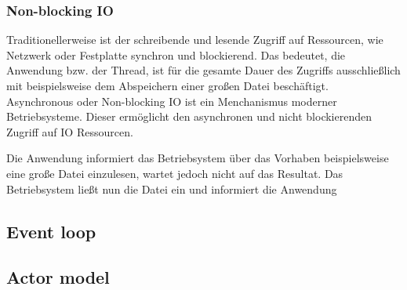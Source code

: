 \subsubsection{Non-blocking IO}
Traditionellerweise ist der schreibende und lesende Zugriff auf Ressourcen, wie Netzwerk oder Festplatte synchron und blockierend. Das bedeutet, die Anwendung bzw. der Thread, ist für die gesamte Dauer des Zugriffs ausschließlich mit beispielsweise dem Abspeichern einer großen Datei beschäftigt.\\
Asynchronous oder Non-blocking IO ist ein Menchanismus moderner Betriebsysteme. Dieser ermöglicht den asynchronen und nicht blockierenden Zugriff auf IO Ressourcen.

Die Anwendung informiert das Betriebsystem über das Vorhaben beispielsweise eine große Datei einzulesen, wartet jedoch nicht auf das Resultat. Das Betriebsystem ließt nun die Datei ein und informiert die Anwendung 


\subsection{Event loop}

\subsection{Actor model}

\pagebreak

